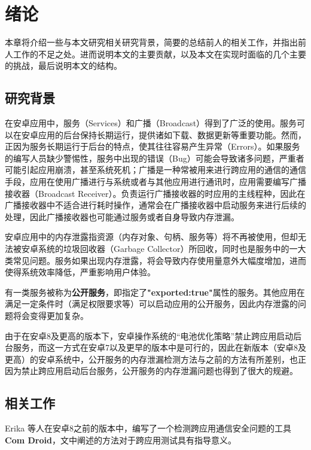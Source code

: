 \chapter{绪论}\label{chapter_introduction}

本章将介绍一些与本文研究相关研究背景，简要的总结前人的相关工作，并指出前人工作的不足之处。进而说明本文的主要贡献，以及本文在实现时面临的几个主要的挑战，最后说明本文的结构。
\section{研究背景}
在安卓应用中，服务（Services）和广播（Broadcast）得到了广泛的使用。服务可以在安卓应用的后台保持长期运行，提供诸如下载、数据更新等重要功能。然而，正因为服务长期运行于后台的特点，使其往往容易产生异常（Errors）。如果服务的编写人员缺少警惕性，服务中出现的错误（Bug）可能会导致诸多问题，严重者可能引起应用崩溃，甚至系统死机；广播是一种常被用来进行跨应用的通信的通信手段，应用在使用广播进行与系统或者与其他应用进行通讯时，应用需要编写广播接收器（Broadcast Receiver）。负责运行广播接收器的时应用的主线程种，因此在广播接收器中不适合进行耗时操作，通常会在广播接收器中启动服务来进行后续的处理，因此广播接收器也可能通过服务或者自身导致内存泄漏。

安卓应用中的内存泄露指资源（内存对象、句柄、服务等）将不再被使用，但却无法被安卓系统的垃圾回收器（Garbage Collector）所回收，同时也是服务中的一大类常见问题。服务如果出现内存泄露，将会导致内存使用量意外大幅度增加，进而使得系统效率降低，严重影响用户体验。

有一类服务被称为\textbf{公开服务}，即指定了\textbf{"exported:true"}属性的服务。其他应用在满足一定条件时（满足权限要求等）可以启动应用的公开服务，因此内存泄露的问题将会变得更加复杂。

由于在安卓8及更高的版本下，安卓操作系统的“电池优化策略”禁止跨应用启动后台服务\cite{android-service-limit}，而这一方式在安卓7以及更早的版本中是可行的，因此在新版本（安卓8及更高）的安卓系统中，公开服务的内存泄漏检测方法与之前的方法\cite{jun2018lesdroid}有所差别，也正因为禁止跨应用启动后台服务，公开服务的内存泄漏问题也得到了很大的规避。

\section{相关工作}

Erika 等人在安卓8之前的版本中，编写了一个检测跨应用通信安全问题的工具\textbf{Com Droid}\cite{chin2011analyzing}，文中阐述的方法对于跨应用测试具有指导意义。
\newline

